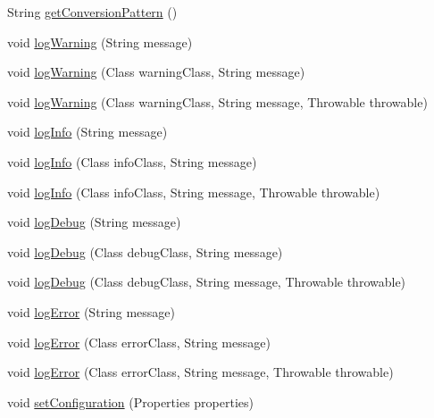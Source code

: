 \begin{DoxyCompactItemize}
\item 
String \mbox{\hyperlink{interfacenet_1_1dlinkddns_1_1atulsaurabh_1_1hasselfreelogger_1_1api_1_1_logger_af32cfe36f98ae7223ab0ec37fc6c67f5}{get\+Conversion\+Pattern}} ()
\item 
void \mbox{\hyperlink{interfacenet_1_1dlinkddns_1_1atulsaurabh_1_1hasselfreelogger_1_1api_1_1_logger_a7a267e7aa9c678bdb6a3a7ca02a10efd}{log\+Warning}} (String message)
\item 
void \mbox{\hyperlink{interfacenet_1_1dlinkddns_1_1atulsaurabh_1_1hasselfreelogger_1_1api_1_1_logger_a2db4a8f0188cecd4ba6780b31136ded8}{log\+Warning}} (Class warning\+Class, String message)
\item 
void \mbox{\hyperlink{interfacenet_1_1dlinkddns_1_1atulsaurabh_1_1hasselfreelogger_1_1api_1_1_logger_af0535a8b640adb65e6830468b327d1da}{log\+Warning}} (Class warning\+Class, String message, Throwable throwable)
\item 
void \mbox{\hyperlink{interfacenet_1_1dlinkddns_1_1atulsaurabh_1_1hasselfreelogger_1_1api_1_1_logger_a90d0ff9fde52620be6884f4dee4ba00f}{log\+Info}} (String message)
\item 
void \mbox{\hyperlink{interfacenet_1_1dlinkddns_1_1atulsaurabh_1_1hasselfreelogger_1_1api_1_1_logger_ac0c7463bc249c77cd33e02b99a77a8d8}{log\+Info}} (Class info\+Class, String message)
\item 
void \mbox{\hyperlink{interfacenet_1_1dlinkddns_1_1atulsaurabh_1_1hasselfreelogger_1_1api_1_1_logger_a07cf4314c71f95135245d10dffc14d2f}{log\+Info}} (Class info\+Class, String message, Throwable throwable)
\item 
void \mbox{\hyperlink{interfacenet_1_1dlinkddns_1_1atulsaurabh_1_1hasselfreelogger_1_1api_1_1_logger_aabcbfa63158adde4db9d5735ef47663c}{log\+Debug}} (String message)
\item 
void \mbox{\hyperlink{interfacenet_1_1dlinkddns_1_1atulsaurabh_1_1hasselfreelogger_1_1api_1_1_logger_a029beee59dc44362c279f0a067dd0703}{log\+Debug}} (Class debug\+Class, String message)
\item 
void \mbox{\hyperlink{interfacenet_1_1dlinkddns_1_1atulsaurabh_1_1hasselfreelogger_1_1api_1_1_logger_aff388bb623493721b9aac70ef39492ec}{log\+Debug}} (Class debug\+Class, String message, Throwable throwable)
\item 
void \mbox{\hyperlink{interfacenet_1_1dlinkddns_1_1atulsaurabh_1_1hasselfreelogger_1_1api_1_1_logger_ae6a2cef332dfb10951c4cbfd822bbb63}{log\+Error}} (String message)
\item 
void \mbox{\hyperlink{interfacenet_1_1dlinkddns_1_1atulsaurabh_1_1hasselfreelogger_1_1api_1_1_logger_adf72322be1f6a5eaf0cf1b491b430b06}{log\+Error}} (Class error\+Class, String message)
\item 
void \mbox{\hyperlink{interfacenet_1_1dlinkddns_1_1atulsaurabh_1_1hasselfreelogger_1_1api_1_1_logger_a387cbc7fc16609202f2c63e88233ba49}{log\+Error}} (Class error\+Class, String message, Throwable throwable)
\item 
void \mbox{\hyperlink{interfacenet_1_1dlinkddns_1_1atulsaurabh_1_1hasselfreelogger_1_1api_1_1_logger_abe93800e399a9836cb92e6cb902a4ad8}{set\+Configuration}} (Properties properties)
\end{DoxyCompactItemize}



